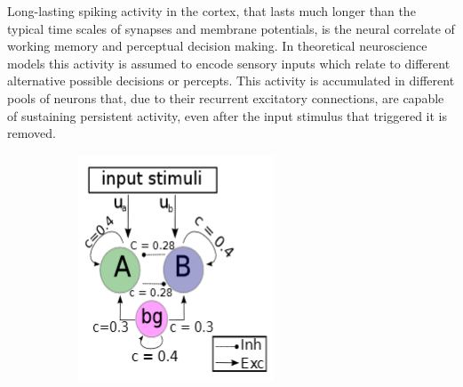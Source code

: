 \documentclass[main]{subfiles}
\begin{document}
Long-lasting spiking activity in the cortex, that lasts much longer than the typical time scales of synapses and membrane potentials, is the neural correlate of working memory and perceptual decision making. In theoretical neuroscience models this activity is assumed to encode sensory inputs which relate to different alternative possible decisions or percepts. This activity is accumulated in different pools of neurons that, due to their recurrent excitatory connections, are capable of sustaining persistent activity, even after the input stimulus that triggered it is removed.

%
\begin{figure}
     \centering
     \begin{subfigure}[b]{0.47\textwidth}
        \centering
        \includegraphics[width=\textwidth]{12_NeuromorphicSystems2/figures/bista.PNG}
        \caption{}
        \label{fig:cpg0}
     \end{subfigure}
     \hfill
     \begin{subfigure}[b]{0.47\textwidth}
         \centering

\end{subfigure}
\end{figure}
\end{document}
